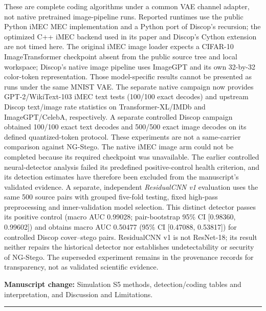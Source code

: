 \documentclass[12pt,a4paper]{article}
\newcommand{\manuscriptchange}[1]{\par\smallskip\noindent\textcolor{blue!70!black}{\textbf{Manuscript change:} #1}\par\smallskip}
\begin{document}
These are complete coding algorithms under a common VAE channel adapter, not native pretrained image-pipeline runs. Reported runtimes use the public Python iMEC MEC implementation and a Python port of Discop's recursion; the optimized C++ iMEC backend used in its paper and Discop's Cython extension are not timed here. The original iMEC image loader expects a CIFAR-10 ImageTransformer checkpoint absent from the public source tree and local workspace; Discop's native image pipeline uses ImageGPT and its own 32-by-32 color-token representation. Those model-specific results cannot be presented as runs under the same MNIST VAE. The separate native campaign now provides GPT-2/WikiText-103 iMEC text tests (100/100 exact decodes) and upstream Discop text/image rate statistics on Transformer-XL/IMDb and ImageGPT/CelebA, respectively. A separate controlled Discop campaign obtained 100/100 exact text decodes and 500/500 exact image decodes on its defined quantized-token protocol. These experiments are not a same-carrier comparison against NG-Stego. The native iMEC image arm could not be completed because its required checkpoint was unavailable. The earlier controlled neural-detector analysis failed its predefined
positive-control health criterion, and its detection estimates have
therefore been excluded from the manuscript's validated evidence.
A separate, independent \emph{ResidualCNN v1} evaluation uses the
same 500 source pairs with grouped five-fold testing, fixed
high-pass preprocessing and inner-validation model selection.
This distinct detector passes its positive control (macro AUC
0.99028; pair-bootstrap 95\% CI [0.98360, 0.99602]) and obtains
macro AUC 0.50477 (95\% CI [0.47088, 0.53817])
for controlled Discop cover--stego pairs.
ResidualCNN v1 is not ResNet-18; its result neither repairs the
historical detector nor establishes undetectability or security of
NG-Stego. The superseded experiment remains in the provenance
records for transparency, not as validated scientific evidence.

\manuscriptchange{Simulation S5 methods, detection/coding tables and interpretation, and Discussion and Limitations.}

\vspace{1em}\hrule\vspace{1em}
\end{document}

